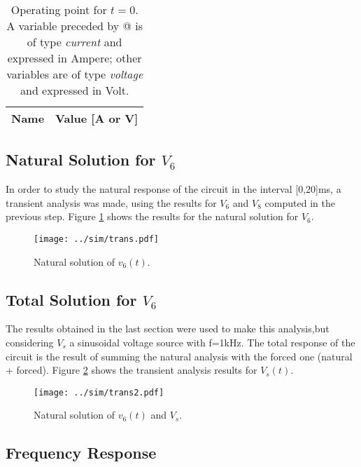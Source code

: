 \begin{table}[h]
  \centering
  \begin{tabular}{|l|r|}
    \hline    
    {\bf Name} & {\bf Value [A or V]} \\ \hline
    
  \end{tabular}
  \caption{Operating point for $t=0$. A variable preceded by @ is of type {\em current}
    and expressed in Ampere; other variables are of type {\it voltage} and expressed in
    Volt.}
  \label{tab:SIM_PASSO2}
\end{table}

\subsection{Natural Solution for $V_6$}

In order to study the natural response of the circuit in the interval [0,20]ms, a transient analysis was made, using the results for $V_6$ and $V_8$ computed in the previous step. Figure \ref{fig:SIM_NAT_SOL} shows the results for the natural solution for $V_6$.

\begin{figure}[h] \centering
\vspace{-3cm}
\texttt{[image: ../sim/trans.pdf]}
\caption{Natural solution of $v_6(t)$.}
\label{fig:SIM_NAT_SOL}
\end{figure}

\newpage
\subsection{Total Solution for $V_6$}

The results obtained in the last section were used to make this analysis,but considering $V_s$ a sinusoidal voltage source with f=1kHz. The total response of the circuit is the result of summing the natural analysis with the forced one (natural + forced). 
Figure \ref{fig:SIM_TOT_SOL} shows the transient analysis results for $V_s(t)$.

\begin{figure}[h] \centering
\texttt{[image: ../sim/trans2.pdf]}
\caption{Natural solution of $v_6(t)$ and $V_s$.}
\label{fig:SIM_TOT_SOL}
\end{figure}

\newpage
\subsection{Frequency Response}


